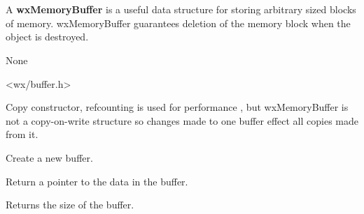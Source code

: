 
\section{}\label{wxmemorybuffer}

A {\bf wxMemoryBuffer} is a useful data structure for storing arbitrary sized blocks
of memory. wxMemoryBuffer guarantees deletion of the memory block when the object
is destroyed. 


None


<wx/buffer.h>


\label{wxmemorybufferctor}


Copy constructor, refcounting is used for performance , but wxMemoryBuffer
is not a copy-on-write structure so changes made to one buffer effect
all copies made from it.


Create a new buffer.


\label{wxmemorybuffergetdata}


Return a pointer to the data in the buffer.

\label{wxmemorybuffergetbufsize}


Returns the size of the buffer.

\label{wxmemorybuffergetdatalen}


